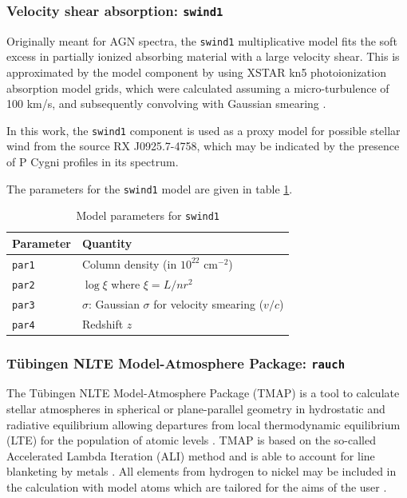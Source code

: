 			\subsubsection{Velocity shear absorption: \texttt{swind1}}
				Originally meant for AGN spectra, the \texttt{swind1} multiplicative model fits the soft excess in partially ionized absorbing material with a large velocity shear. This is approximated by the model component by using XSTAR kn5 photoionization absorption model grids, which were calculated assuming a micro-turbulence of 100 km/s, and subsequently convolving with Gaussian smearing \cite{swind1}.
				
				In this work, the \texttt{swind1} component is used as a proxy model for possible stellar wind from the source RX J0925.7-4758, which may be indicated by the presence of P Cygni profiles in its spectrum.
				
				The parameters for the \texttt{swind1} model are given in table \ref{param:swind1}.
				\begin{table}[h!]
					\centering
					\caption{Model parameters for \texttt{swind1}}
					\label{param:swind1}
					\begin{tabular}{p{}p{}}
						\hline
						\textbf{Parameter} & \textbf{Quantity} \\ \hline
						{\texttt{par1}} & {Column density (in $10^{22}$ cm$^{-2}$)} \\ %
						{\texttt{par2}} & {$\log{\xi}$ where $\xi=L/nr^2$} \\ %
						{\texttt{par3}} & {$\sigma$: Gaussian $\sigma$ for velocity smearing ($v/c$)} \\ %
						{\texttt{par4}} & {Redshift $z$} \\ \hline
					\end{tabular}
				\end{table}
			
			\subsubsection{T\"{u}bingen NLTE Model-Atmosphere Package: \texttt{rauch}}
				The T\"{u}bingen NLTE Model-Atmosphere Package (TMAP) is a tool to calculate stellar atmospheres in spherical or plane-parallel geometry in hydrostatic and radiative equilibrium allowing departures from local thermodynamic equilibrium (LTE) for the population of atomic levels \cite{wernerDreizler}. TMAP is based on the so-called Accelerated Lambda Iteration (ALI) method and is able to account for line blanketing by metals \cite{rauchALI}. All elements from hydrogen to nickel may be included in the calculation with model atoms which are tailored for the aims of the user \cite{wernerTMAP}.
				
